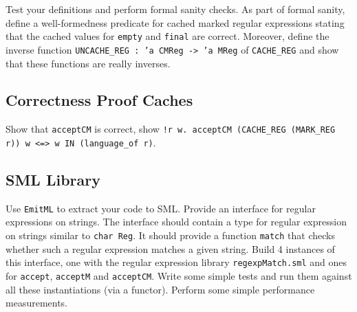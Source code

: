 \documentclass[a4paper,10pt,oneside]{scrartcl}
\begin{document}
Test your definitions and perform formal sanity checks. As part of formal sanity, 
define a well-formedness predicate for cached marked regular expressions stating that the cached values for \texttt{empty} and \texttt{final} are correct. 
Moreover, define the inverse function \texttt{UNCACHE\_REG :\ 'a CMReg -> 'a MReg} of \texttt{CACHE\_REG} and show that these functions are really inverses. 

\subsection{Correctness Proof Caches}

Show that \texttt{acceptCM} is correct, \ie show
\texttt{!r w.\ acceptCM (CACHE\_REG (MARK\_REG r)) w <=> w IN (language\_of r)}.


\subsection{SML Library}

Use \texttt{EmitML} to extract your code to SML. Provide an interface for regular expressions on strings. The interface should contain a type for regular expression on strings similar to \texttt{char Reg}. It should provide a function \texttt{match} that checks whether such a regular expression matches a given string. Build 4 instances of this interface, one with the regular expression library \texttt{regexpMatch.sml} and ones for \texttt{accept}, \texttt{acceptM} and \texttt{acceptCM}. Write some simple tests and run them against all these instantiations (\eg via a functor). Perform some simple performance measurements.
\end{document}
